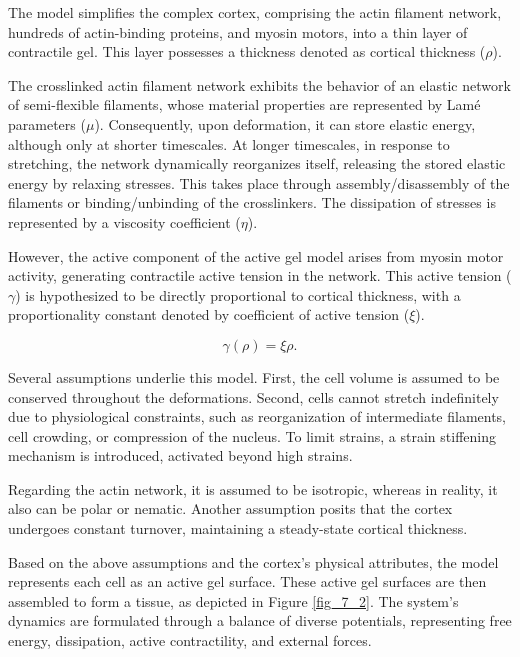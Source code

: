The model simplifies the complex cortex, comprising the actin filament
network, hundreds of actin-binding proteins, and myosin motors, into a
thin layer of contractile gel. This layer possesses a thickness denoted
as cortical thickness (\(\rho\)).

The crosslinked actin filament network exhibits the behavior of an
elastic network of semi-flexible filaments, whose material properties
are represented by Lamé parameters (\(\mu\)). Consequently, upon
deformation, it can store elastic energy, although only at shorter
timescales. At longer timescales, in response to stretching, the network
dynamically reorganizes itself, releasing the stored elastic energy by
relaxing stresses. This takes place through assembly/disassembly of the
filaments or binding/unbinding of the crosslinkers. The dissipation of
stresses is represented by a viscosity coefficient (\(\eta\)).

However, the active component of the active gel model arises from myosin
motor activity, generating contractile active tension in the network.
This active tension (\(\gamma\)) is hypothesized to be directly
proportional to cortical thickness, with a proportionality constant
denoted by coefficient of active tension (\(\xi\)).


\begin{equation}
	\gamma(\rho) = \xi \rho.
\end{equation}

Several assumptions underlie this model. First, the cell volume is
assumed to be conserved throughout the deformations. Second, cells
cannot stretch indefinitely due to physiological constraints, such as
reorganization of intermediate filaments, cell crowding, or compression
of the nucleus. To limit strains, a strain stiffening mechanism is
introduced, activated beyond high strains.

Regarding the actin network, it is assumed to be isotropic, whereas in
reality, it also can be polar or nematic. Another assumption posits that
the cortex undergoes constant turnover, maintaining a steady-state
cortical thickness.

Based on the above assumptions and the cortex's physical attributes, the
model represents each cell as an active gel surface. These active gel
surfaces are then assembled to form a tissue, as depicted in Figure \ref{fig_7_2}.
The system's dynamics are formulated
through a balance of diverse potentials, representing free energy,
dissipation, active contractility, and external forces.

